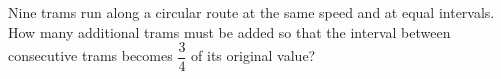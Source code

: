 Nine trams run along a circular route at the same speed and at equal intervals. How many additional trams must be added so that the interval between consecutive trams becomes $\dfrac{3}{4}$ of its original value?

